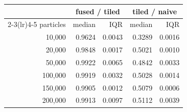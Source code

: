 \begin{tabular}{r rr rr}
\toprule
& \multicolumn{2}{c}{fused / tiled} & \multicolumn{2}{c}{tiled / naive} \\
\cmidrule(lr){2-3}\cmidrule(lr){4-5}
particles & median & IQR & median & IQR \\
\midrule
10,000 & 0.9624 & 0.0043 & 0.3289 & 0.0016 \\
20,000 & 0.9848 & 0.0017 & 0.5021 & 0.0010 \\
50,000 & 0.9922 & 0.0065 & 0.4842 & 0.0033 \\
100,000 & 0.9919 & 0.0032 & 0.5028 & 0.0014 \\
150,000 & 0.9905 & 0.0012 & 0.5079 & 0.0006 \\
200,000 & 0.9913 & 0.0097 & 0.5112 & 0.0039 \\
\bottomrule
\end{tabular}
